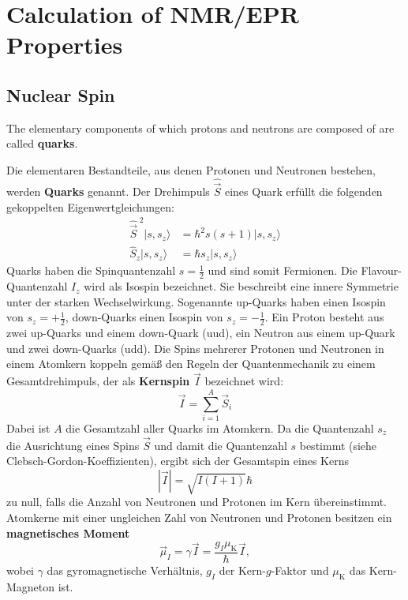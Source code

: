 \documentclass[9pt]{report}
\begin{document}
\section{Calculation of NMR/EPR Properties}

\subsection{Nuclear Spin}
The elementary components of which protons and neutrons are composed of are called \textbf{quarks}.




Die elementaren Bestandteile, aus denen Protonen und Neutronen bestehen, werden \textbf{Quarks} genannt. Der Drehimpuls $\hat{\vec{S}}$ eines Quark erfüllt die folgenden gekoppelten Eigenwertgleichungen:
\begin{align}
\hat{\vec{S}}^{\;2}\big|s,s_{z}\big\rangle &= \hbar^{2}s(s+1)\big|s,s_{z}\big\rangle\\
\hat{S}_{z}\big|s,s_{z}\big\rangle &= \hbar s_{z}\big|s,s_{z}\big\rangle
\end{align}
Quarks haben die Spinquantenzahl $s=\frac{1}{2}$ und sind somit Fermionen. Die Flavour-Quantenzahl $I_{z}$ wird als Isospin bezeichnet. Sie beschreibt eine innere Symmetrie unter der starken Wechselwirkung. Sogenannte up-Quarks haben einen Isospin von $s_{z}=+\frac{1}{2}$, down-Quarks einen Isospin von $s_{z}=-\frac{1}{2}$. Ein Proton besteht aus zwei up-Quarks und einem down-Quark (uud), ein Neutron aus einem up-Quark und zwei down-Quarks (udd). Die Spins mehrerer Protonen und Neutronen in einem Atomkern koppeln gemäß den Regeln der Quantenmechanik zu einem Gesamtdrehimpuls, der als \textbf{Kernspin} $\vec{I}$ bezeichnet wird:
\begin{equation}
\vec{I}=\sum_{i=1}^{A}\vec{S}_{i}
\end{equation}
Dabei ist $A$ die Gesamtzahl aller Quarks im Atomkern. Da die Quantenzahl $s_z$ die Ausrichtung eines Spins $\vec{S}$ und damit die Quantenzahl $s$ bestimmt (siehe Clebsch-Gordon-Koeffizienten), ergibt sich der Gesamtspin eines Kerns
\begin{equation}
|\vec{I}|=\sqrt{I(I+1)}\hbar
\end{equation}
zu null, falls die Anzahl von Neutronen und Protonen im Kern übereinstimmt. Atomkerne mit einer ungleichen Zahl von Neutronen und Protonen besitzen ein \textbf{magnetisches Moment}
\begin{equation}
\vec{\mu}_{I}=\gamma\vec{I}=\frac{g_{I}\mu_{\mathrm{K}}}{\hbar}\vec{I},
\end{equation}
wobei $\gamma$ das gyromagnetische Verhältnis, $g_{I}$ der Kern-$g$-Faktor und $\mu_{\mathrm{K}}$ das Kern-Magneton ist. 
\end{document}
